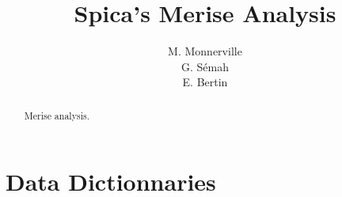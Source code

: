 \documentclass[twoside,a4paper]{article}
\begin{document}
\title{{\sc Spica}'s Merise Analysis}
\author{M. Monnerville\\G. S\'emah\\E. Bertin}

\maketitle

\begin{abstract}
Merise analysis.
\end{abstract}

\listoftables
\listoffigures
\newpage

\section{Data Dictionnaries}

\end{document}
